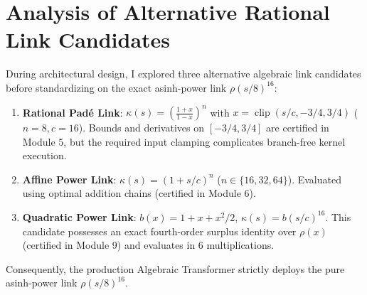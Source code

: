 \documentclass[11pt,a4paper]{article}
\theoremstyle{definition}
\begin{document}
\section{Analysis of Alternative Rational Link Candidates}
\label{app:alternative_links}

During architectural design, I explored three alternative algebraic link candidates before standardizing on the exact asinh-power link $\rho(s/8)^{16}$:
\begin{enumerate}
    \item \textbf{Rational Padé Link}: $\kappa(s) = \left(\frac{1+x}{1-x}\right)^n$ with $x = \operatorname{clip}(s/c, -3/4, 3/4)$ ($n=8, c=16$). Bounds and derivatives on $[-3/4, 3/4]$ are certified in Module 5, but the required input clamping complicates branch-free kernel execution.
    \item \textbf{Affine Power Link}: $\kappa(s) = (1 + s/c)^n$ ($n \in \{16, 32, 64\}$). Evaluated using optimal addition chains (certified in Module 6).
    \item \textbf{Quadratic Power Link}: $b(x) = 1 + x + x^2/2$, $\kappa(s) = b(s/c)^{16}$. This candidate possesses an exact fourth-order surplus identity over $\rho(x)$ (certified in Module 9) and evaluates in 6 multiplications.
\end{enumerate}
Consequently, the production Algebraic Transformer strictly deploys the pure asinh-power link $\rho(s/8)^{16}$.
\end{document}
